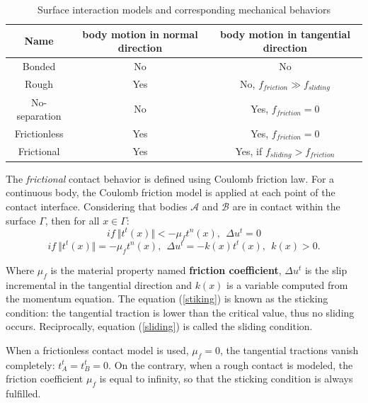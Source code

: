 \begin{table}[H]

\begin{center}
\begin{tabular}{||c|c|c||}
\hline
Name & body motion in normal direction & body motion in tangential direction \\
\hline\hline
Bonded & No & No\\
\hline
Rough & Yes & No, $f_{friction} \gg f_{sliding}$ \\
\hline
No-separation & No & Yes, $f_{friction} = 0$ \\
\hline
Frictionless & Yes & Yes, $f_{friction} = 0$ \\
\hline
Frictional & Yes & Yes, if $f_{sliding} > f_{friction}$\\
\hline
\end{tabular}
\caption{Surface interaction models and corresponding mechanical behaviors}
\label{contactB}
\end{center}
\end{table}

The \textit{frictional} contact behavior is defined using Coulomb friction law. For a continuous body, the Coulomb friction model is applied at each point of the contact interface.
Considering that bodies $\mathcal{A}$ and $\mathcal{B}$ are in contact within the surface $\Gamma$, then for all $x \in \Gamma$:
\begin{equation}
\label{stiking}
if \ \Vert t^t(x) \Vert < -\mu_f t^n(x),\ \ \Delta u^t=0 
\end{equation}
\begin{equation}
\label{sliding}
if \ \Vert t^t(x) \Vert = -\mu_f t^n(x),\ \ \Delta u^t=-k(x)t^t(x),\ \ k(x)>0.
\end{equation}

Where $\mu_f$ is the material property named \textbf{friction coefficient},  $\Delta u^t$ is the slip incremental in the tangential direction and $k(x)$ is a variable computed from the momentum equation. The equation (\ref{stiking}) is known as the sticking condition: the tangential traction is lower than the critical value, thus no sliding occurs. Reciprocally, equation (\ref{sliding}) is called the sliding condition.

When a frictionless contact model is used, $\mu_f = 0$, the tangential tractions vanish completely: $t_A^t = t_B^t = 0$. On the contrary, when a rough contact is modeled, the friction coefficient $\mu_f$ is equal to infinity, so that the sticking condition is always fulfilled. 

